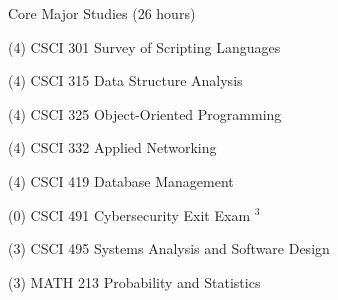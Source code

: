 
\begin{reqgroup}{Core Major Studies (26 hours)}
\begin{checklist}
\begin{minipage}{0.5\linewidth}
	\item (4) CSCI 301	Survey of Scripting Languages
	\item (4) CSCI 315	Data Structure Analysis
	\item (4) CSCI 325	Object-Oriented Programming
	\item (4) CSCI 332	Applied Networking
\end{minipage}
\begin{minipage}{0.5\linewidth}
	\item (4) CSCI 419	Database Management
	\item (0) CSCI 491	Cybersecurity Exit Exam $^3$
	\item (3) CSCI 495	Systems Analysis and Software Design
	\item (3) MATH 213	Probability and Statistics
	\end{minipage}
\end{checklist}
\end{reqgroup}

